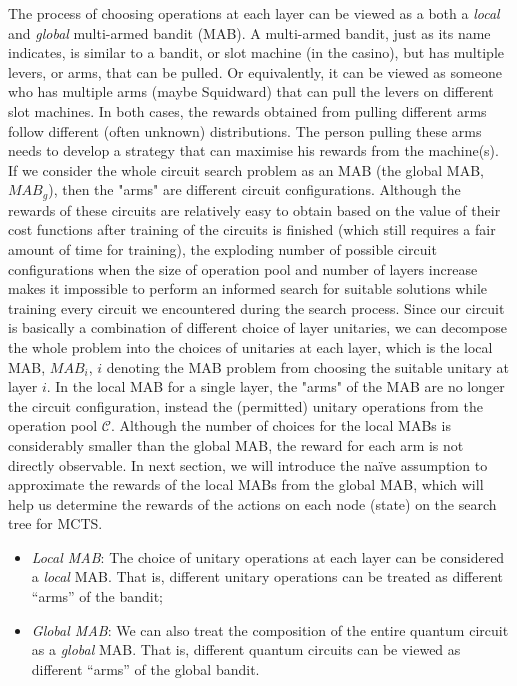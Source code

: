 \documentclass{ieeeaccess}
\begin{document}
  The process of choosing operations at each layer can be viewed as a both a \textit{local} and \textit{global} multi-armed bandit (MAB). A multi-armed bandit, just as its name indicates, is similar to a bandit, or slot machine (in the casino), but has multiple levers, or arms, that can be pulled. Or equivalently, it can be viewed as someone who has multiple arms (maybe Squidward) that can pull the levers on different slot machines. In both cases, the rewards obtained from pulling different arms follow different (often unknown) distributions. The person pulling these arms needs to develop a strategy that can maximise his rewards from the machine(s). If we consider the whole circuit search problem as an MAB (the global MAB, $MAB_g$), then the "arms" are different circuit configurations. Although the rewards of these circuits are relatively easy to obtain based on the value of their cost functions after training of the circuits is finished (which still requires a fair amount of time for training), the exploding number of possible circuit configurations when the size of operation pool and number of layers increase makes it impossible to perform an informed search for suitable solutions while training every circuit we encountered during the search process. Since our circuit is basically a combination of different choice of layer unitaries, we can decompose the whole problem into the choices of unitaries at each layer, which is the local MAB, $MAB_i$, $i$ denoting the MAB problem from choosing the suitable unitary at layer $i$. In the local MAB for a single layer, the "arms" of the MAB are no longer the circuit configuration, instead the (permitted) unitary operations from the operation pool $\mathcal{C}$. Although the number of choices for the local MABs is considerably smaller than the global MAB, the reward for each arm is not directly observable. In next section, we will introduce the na\"ive assumption \cite{CMAB_RTS} to approximate the rewards of the local MABs from the global MAB, which will help us determine the rewards of the actions on each node (state) on the search tree for MCTS.
  
  
  
  \begin{itemize}
      \item \textit{Local MAB}: The choice of unitary operations at each layer can be considered a \textit{local} MAB. That is, different unitary operations can be treated as different ``arms'' of the bandit;
      \item \textit{Global MAB}: We can also treat the composition of the entire quantum circuit as a \textit{global} MAB. That is, different quantum circuits can be viewed as different ``arms'' of the global bandit.
  \end{itemize}
  
\end{document}
